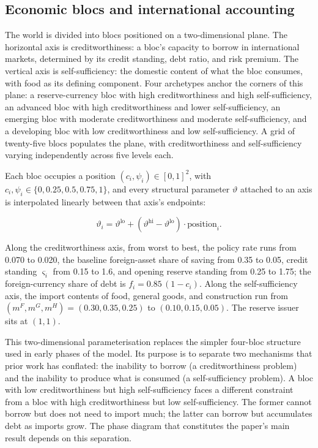 \documentclass[preprint,review,12pt]{elsarticle}
\begin{document}
\subsection{Economic blocs and international accounting}

The world is divided into blocs positioned on a two-dimensional plane.
The horizontal axis is creditworthiness: a bloc's capacity to borrow in
international markets, determined by its credit standing, debt ratio,
and risk premium. The vertical axis is self-sufficiency: the domestic
content of what the bloc consumes, with food as its defining component.
Four archetypes anchor the corners of this plane: a reserve-currency
bloc with high creditworthiness and high self-sufficiency, an advanced
bloc with high creditworthiness and lower self-sufficiency, an emerging
bloc with moderate creditworthiness and moderate self-sufficiency, and a
developing bloc with low creditworthiness and low self-sufficiency. A
grid of twenty-five blocs populates the plane, with creditworthiness and
self-sufficiency varying independently across five levels each.

Each bloc occupies a position \((c_i, \psi_i) \in [0,1]^2\), with
\(c_i, \psi_i \in \{0, 0.25, 0.5, 0.75, 1\}\), and every structural
parameter \(\vartheta\) attached to an axis is interpolated linearly
between that axis's endpoints:

\[\vartheta_i = \vartheta^{\mathrm{lo}} + \left( \vartheta^{\mathrm{hi}} - \vartheta^{\mathrm{lo}} \right) \cdot \mathrm{position}_i. \tag{2}\]

Along the creditworthiness axis, from worst to best, the policy rate
runs from 0.070 to 0.020, the baseline foreign-asset share of saving
from 0.35 to 0.05, credit standing \(\varsigma_i\) from 0.15 to 1.6, and
opening reserve standing from 0.25 to 1.75; the foreign-currency share
of debt is \(f_i = 0.85\,(1 - c_i)\). Along the self-sufficiency axis,
the import contents of food, general goods, and construction run from
\((m^F, m^G, m^H) = (0.30, 0.35, 0.25)\) to \((0.10, 0.15, 0.05)\). The
reserve issuer sits at \((1, 1)\).

This two-dimensional parameterisation replaces the simpler four-bloc
structure used in early phases of the model. Its purpose is to separate
two mechanisms that prior work has conflated: the inability to borrow (a
creditworthiness problem) and the inability to produce what is consumed
(a self-sufficiency problem). A bloc with low creditworthiness but high
self-sufficiency faces a different constraint from a bloc with high
creditworthiness but low self-sufficiency. The former cannot borrow but
does not need to import much; the latter can borrow but accumulates debt
as imports grow. The phase diagram that constitutes the paper's main
result depends on this separation.
\end{document}
